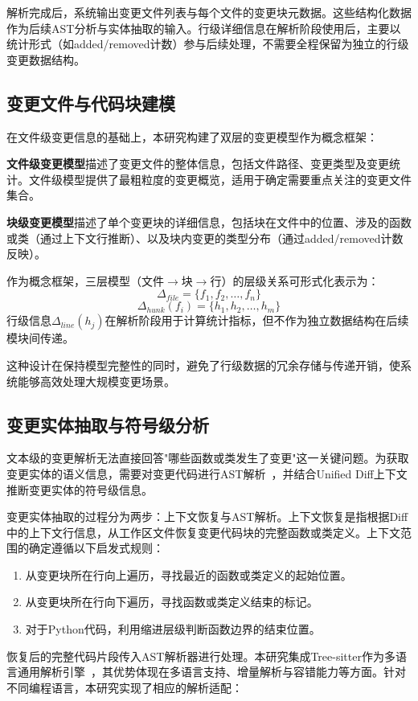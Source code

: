 解析完成后，系统输出变更文件列表与每个文件的变更块元数据。这些结构化数据作为后续AST分析与实体抽取的输入。行级详细信息在解析阶段使用后，主要以统计形式（如added/removed计数）参与后续处理，不需要全程保留为独立的行级变更数据结构。

\subsection{变更文件与代码块建模}
在文件级变更信息的基础上，本研究构建了双层的变更模型作为概念框架：

\textbf{文件级变更模型}描述了变更文件的整体信息，包括文件路径、变更类型及变更统计。文件级模型提供了最粗粒度的变更概览，适用于确定需要重点关注的变更文件集合。

\textbf{块级变更模型}描述了单个变更块的详细信息，包括块在文件中的位置、涉及的函数或类（通过上下文行推断）、以及块内变更的类型分布（通过added/removed计数反映）。

作为概念框架，三层模型（文件$\rightarrow$块$\rightarrow$行）的层级关系可形式化表示为：
\[
\Delta_{file} = \{f_1, f_2, \ldots, f_n\}
\]
\[
\Delta_{hunk}(f_i) = \{h_1, h_2, \ldots, h_m\}
\]
行级信息$\Delta_{line}(h_j)$在解析阶段用于计算统计指标，但不作为独立数据结构在后续模块间传递。

这种设计在保持模型完整性的同时，避免了行级数据的冗余存储与传递开销，使系统能够高效处理大规模变更场景。

\subsection{变更实体抽取与符号级分析}
文本级的变更解析无法直接回答"哪些函数或类发生了变更"这一关键问题。为获取变更实体的语义信息，需要对变更代码进行AST解析~\cite{Aho2006Compilers}，并结合Unified Diff上下文推断变更实体的符号级信息。

变更实体抽取的过程分为两步：上下文恢复与AST解析。上下文恢复是指根据Diff中的上下文行信息，从工作区文件恢复变更代码块的完整函数或类定义。上下文范围的确定遵循以下启发式规则：

\begin{enumerate}
    \item 从变更块所在行向上遍历，寻找最近的函数或类定义的起始位置。
    \item 从变更块所在行向下遍历，寻找函数或类定义结束的标记。
    \item 对于Python代码，利用缩进层级判断函数边界的结束位置。
\end{enumerate}

恢复后的完整代码片段传入AST解析器进行处理。本研究集成Tree-sitter作为多语言通用解析引擎~\cite{Brunsfeld2018TreeSitter}，其优势体现在多语言支持、增量解析与容错能力等方面。针对不同编程语言，本研究实现了相应的解析适配：

